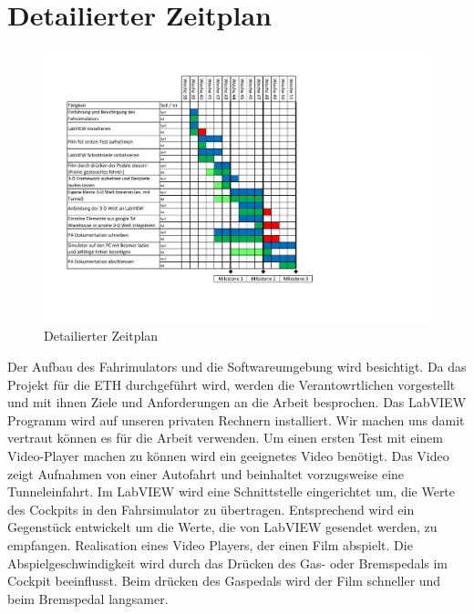 \section{Detailierter Zeitplan}
\begin{figure}[H]
\centering 
\includegraphics[angle=90,scale=1.0]{src/Zeitplan.pdf}
\caption{Detailierter Zeitplan} %
\label{zeitplan} %
\end{figure}
\newpage
{}
Der Aufbau des Fahrimulators und die Softwareumgebung wird besichtigt. Da das Projekt für die ETH durchgeführt wird, werden die Verantowrtlichen vorgestellt und mit ihnen Ziele und Anforderungen an die Arbeit besprochen. 
Das LabVIEW Programm wird auf unseren privaten Rechnern installiert. Wir machen uns damit vertraut können es für die Arbeit verwenden. 
Um einen ersten Test mit einem Video-Player machen zu können wird ein geeignetes Video benötigt. Das Video zeigt Aufnahmen von einer Autofahrt und beinhaltet vorzugsweise eine Tunneleinfahrt.
Im LabVIEW wird eine Schnittstelle eingerichtet um, die Werte des Cockpits in den Fahrsimulator zu übertragen. Entsprechend wird ein Gegenstück entwickelt um die Werte, die von LabVIEW gesendet werden, zu empfangen. 
Realisation eines Video Players, der einen Film abspielt. Die Abspielgeschwindigkeit wird durch das Drücken des Gas- oder Bremspedals im Cockpit beeinflusst. Beim drücken des Gaspedals wird der Film schneller und beim Bremspedal langsamer. 
